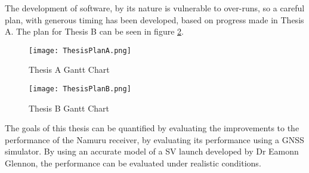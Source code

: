 The development of software, by its nature is vulnerable to over-runs, so a careful plan, with generous timing has been developed, based on progress made in Thesis A. The plan for Thesis B can be seen in figure \ref{fig:ThesisBGantt}.

\begin{figure}[!htb] 
    \centering
    \texttt{[image: ThesisPlanA.png]} 
    \caption{Thesis A Gantt Chart}
    \label{fig:ThesisAGantt}
\end{figure}

\begin{figure}[!htb] 
    \centering
    \texttt{[image: ThesisPlanB.png]} 
    \caption{Thesis B Gantt Chart}
    \label{fig:ThesisBGantt}
\end{figure}

The goals of this thesis can be quantified by evaluating the improvements to the performance of the Namuru receiver, by evaluating its performance using a \ac{GNSS} simulator. By using an accurate model of a \ac{SV} launch developed by Dr Eamonn Glennon, the performance can be evaluated under realistic conditions.




